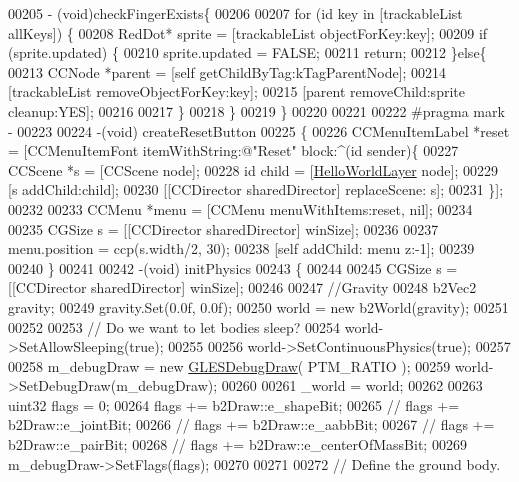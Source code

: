 \begin{DoxyCode}
{{{{{{00205 - (void)checkFingerExists\{
00206     
00207     \textcolor{keywordflow}{for} (\textcolor{keywordtype}{id} key in [trackableList allKeys]) \{
00208         RedDot* sprite = [trackableList objectForKey:key];
00209         \textcolor{keywordflow}{if} (sprite.updated) \{
00210             sprite.updated = FALSE;
00211             \textcolor{keywordflow}{return};
00212         \}\textcolor{keywordflow}{else}\{
00213             CCNode *parent = [\textcolor{keyword}{self} getChildByTag:kTagParentNode];
00214             [trackableList removeObjectForKey:key];
00215             [parent removeChild:sprite cleanup:YES];
00216             
00217         \}
00218     \}
00219 \}
00220 
00221 
00222 \textcolor{preprocessor}{#pragma mark -}
00223 \textcolor{preprocessor}{}
00224 -(void) createResetButton
00225 \{
00226     CCMenuItemLabel *reset = [CCMenuItemFont itemWithString:@"Reset" block:^(id sender)\{
00227         CCScene *s = [CCScene node];
00228         id child = [\hyperlink{interface_hello_world_layer}{HelloWorldLayer} node];
00229         [s addChild:child];
00230         [[CCDirector sharedDirector] replaceScene: s];
00231     \}];
00232     
00233     CCMenu *menu = [CCMenu menuWithItems:reset, nil];
00234     
00235     CGSize s = [[CCDirector sharedDirector] winSize];
00236     
00237     menu.position = ccp(s.width/2, 30);
00238     [\textcolor{keyword}{self} addChild: menu z:-1]; 
00239     
00240 \}
00241 
00242 -(void) initPhysics
00243 \{
00244     
00245     CGSize s = [[CCDirector sharedDirector] winSize];
00246     
00247     \textcolor{comment}{//Gravity}
00248     b2Vec2 gravity;
00249     gravity.Set(0.0f, 0.0f);
00250     world = \textcolor{keyword}{new} b2World(gravity);
00251     
00252     
00253     \textcolor{comment}{// Do we want to let bodies sleep?}
00254     world->SetAllowSleeping(\textcolor{keyword}{true});
00255     
00256     world->SetContinuousPhysics(\textcolor{keyword}{true});
00257     
00258     m\_debugDraw = \textcolor{keyword}{new} \hyperlink{class_g_l_e_s_debug_draw}{GLESDebugDraw}( PTM\_RATIO );
00259     world->SetDebugDraw(m\_debugDraw);
00260     
00261     \_world = world;
00262     
00263     uint32 flags = 0;
00264     flags += b2Draw::e\_shapeBit;
00265     \textcolor{comment}{//      flags += b2Draw::e\_jointBit;}
00266     \textcolor{comment}{//      flags += b2Draw::e\_aabbBit;}
00267     \textcolor{comment}{//      flags += b2Draw::e\_pairBit;}
00268     \textcolor{comment}{//      flags += b2Draw::e\_centerOfMassBit;}
00269     m\_debugDraw->SetFlags(flags);       
00270     
00271     
00272     \textcolor{comment}{// Define the ground body.}
}}}}}}
\end{DoxyCode}

